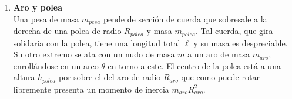 \documentclass[11pt, spanish, a4paper, twoside]{article}
\begin{document}
\begin{enumerate}
\begin{enumerate}
		\item Ahora realice lo mismo pero usando \(\theta\) como coordenada generalizada. Resultado:\\
		$\ddot{\theta} = \dfrac{\left(\ell m_{1} \cos{\left(\theta \right)} \dot{\theta}^{2} - \ell m_{2} \cos{\left(\theta \right)} \dot{\theta}^{2} - g m_{2}\right) \sin{\left(\theta \right)}}{\ell \left(m_{1} \cos^{2}{\left(\theta \right)} + m_{2} \sin^{2}{\left(\theta \right)}\right)}$
		\item ¿Con cuál de estas coordenadas las expresiones de energía resultan más ``informativas''?\\
	\end{enumerate}
	

	\item 
	\begin{minipage}[t][6cm]{0.57\textwidth}
		\textbf{Aro y polea}\\
		Una pesa de masa \(m_{pesa}\) pende de sección de cuerda que sobresale a la derecha de una polea de radio \(R_{polea}\) y masa \(m_{polea}\).
		Tal cuerda, que gira solidaria con la polea, tiene una longitud total \(\ell\) y su masa es despreciable.
		Su otro extremo se ata con un nudo de masa \(m\) a un aro de masa \(m_{aro}\), enrollándose en un arco \(\theta\) en torno a este.
		El centro de la polea está a una altura \(h_{polea}\) por sobre el del aro de radio \(R_{aro}\) que como puede rotar libremente presenta un momento de inercia \(m_{aro} R_{aro}^2\).


\end{minipage}
\end{enumerate}
\end{document}
